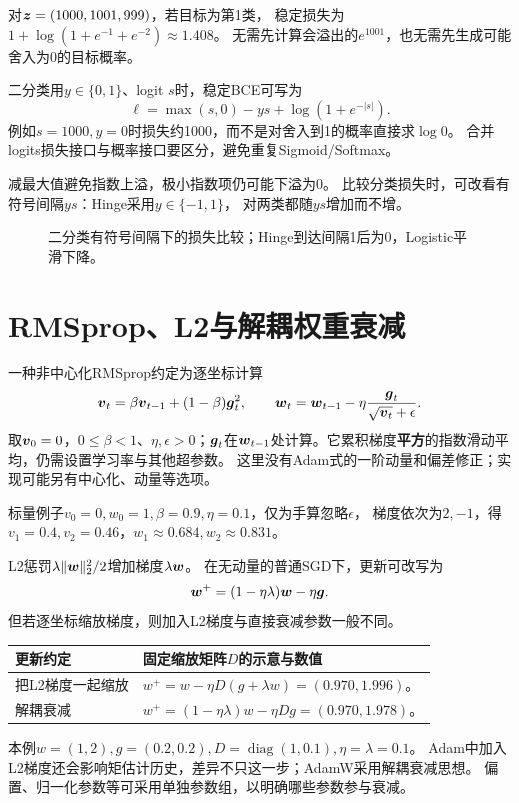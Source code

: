 对$\boldsymbol{z}=(1000,1001,999)$，若目标为第1类，
稳定损失为$1+\log(1+e^{-1}+e^{-2})\approx1.408$。
无需先计算会溢出的$e^{1001}$，也无需先生成可能舍入为0的目标概率。

二分类用$y\in\{0,1\}$、logit $s$时，稳定BCE可写为
\[
 \ell=\max(s,0)-ys+\log(1+e^{-|s|}).
\]
例如$s=1000,y=0$时损失约1000，而不是对舍入到1的概率直接求$\log0$。
合并logits损失接口与概率接口要区分，避免重复Sigmoid/Softmax。

减最大值避免指数上溢，极小指数项仍可能下溢为0。
比较分类损失时，可改看有符号间隔$ys$：Hinge采用$y\in\{-1,1\}$，
对两类都随$ys$增加而不增。

\begin{figure}[htbp]
\centering
\caption{二分类有符号间隔下的损失比较；Hinge到达间隔1后为0，Logistic平滑下降。}
\par\smallskip
{}
\end{figure}

\section{RMSprop、L2与解耦权重衰减}
\label{sec:numeric-decay}
一种非中心化RMSprop约定为逐坐标计算
\[
 \boldsymbol{v}_t=\beta\boldsymbol{v}_{t-1}+(1-\beta)\boldsymbol{g}_t^2,\qquad
 \boldsymbol{w}_t=\boldsymbol{w}_{t-1}-\eta\frac{\boldsymbol{g}_t}{\sqrt{\boldsymbol{v}_t}+\epsilon}.
\]
取$\boldsymbol{v}_0=0$，$0\leq\beta<1$、$\eta,\epsilon>0$；$\boldsymbol{g}_t$在$\boldsymbol{w}_{t-1}$处计算。它累积梯度\textbf{平方}的指数滑动平均，仍需设置学习率与其他超参数。
这里没有Adam式的一阶动量和偏差修正；实现可能另有中心化、动量等选项。

标量例子$v_0=0,w_0=1,\beta=0.9,\eta=0.1$，仅为手算忽略$\epsilon$，
梯度依次为$2,-1$，得$v_1=0.4,v_2=0.46$，$w_1\approx0.684,w_2\approx0.831$。

L2惩罚$\lambda\lVert\boldsymbol{w}\rVert_2^2/2$增加梯度$\lambda\boldsymbol{w}$。
在无动量的普通SGD下，更新可改写为
\[
 \boldsymbol{w}^+=(1-\eta\lambda)\boldsymbol{w}-\eta\boldsymbol{g}.
\]
但若逐坐标缩放梯度，则加入L2梯度与直接衰减参数一般不同。

\begin{center}
\small
\begin{tabularx}{\textwidth}{P{34mm}Y}
\toprule
更新约定 & 固定缩放矩阵$D$的示意与数值\\
\midrule
把L2梯度一起缩放 & $w^+=w-\eta D(g+\lambda w)=(0.970,1.996)$。\\
解耦衰减 & $w^+=(1-\eta\lambda)w-\eta Dg=(0.970,1.978)$。\\
\bottomrule
\end{tabularx}
\end{center}
本例$w=(1,2),g=(0.2,0.2),D=\operatorname{diag}(1,0.1),\eta=\lambda=0.1$。
Adam中加入L2梯度还会影响矩估计历史，差异不只这一步；AdamW采用解耦衰减思想。
偏置、归一化参数等可采用单独参数组，以明确哪些参数参与衰减。

